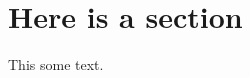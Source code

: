 \documentclass{article}
\begin{document}
\section{Here is a section}
This some text.
\end{document}
